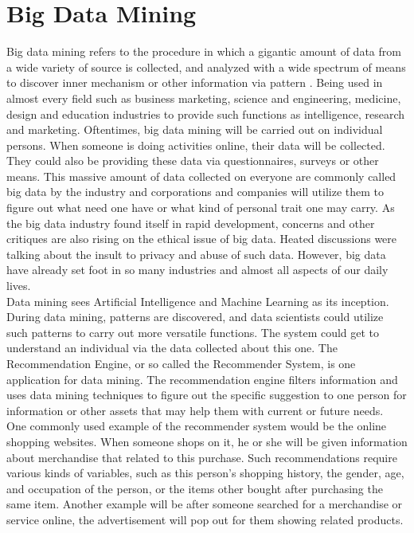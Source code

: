 \documentclass[sigconf]{acmart}
\begin{document}
\section{Big Data Mining}
Big data mining refers to the procedure in which a gigantic amount of data from a wide variety of source is collected, and analyzed with a wide spectrum of means to discover inner mechanism or other information via pattern \cite{Winoto2012}. Being used in almost every field such as business marketing, science and engineering, medicine, design and education industries to provide such functions as intelligence, research and marketing. Oftentimes, big data mining will be carried out on individual persons. When someone is doing activities online, their data will be collected. They could also be providing these data via questionnaires, surveys or other means. This massive amount of data collected on everyone are commonly called big data by the industry and corporations and companies will utilize them to figure out what need one have or what kind of personal trait one may carry.
As the big data industry found itself in rapid development, concerns and other critiques are also rising on the ethical issue of big data. Heated discussions were talking about the insult to privacy and abuse of such data. However, big data have already set foot in so many industries and almost all aspects of our daily lives\cite{Siemens2013}.\\
Data mining sees Artificial Intelligence and Machine Learning as its inception. During data mining, patterns are discovered, and data scientists could utilize such patterns to carry out more versatile functions. The system could get to understand an individual via the data collected about this one. The Recommendation Engine, or so called the Recommender System, is one application for data mining. The recommendation engine filters information and uses data mining techniques to figure out the specific suggestion to one person for information or other assets that may help them with current or future needs.\\
One commonly used example of the recommender system would be the online shopping websites. When someone shops on it, he or she will be given information about merchandise that related to this purchase. Such recommendations require various kinds of variables, such as this person's shopping history, the gender, age, and occupation of the person, or the items other bought after purchasing the same item. Another example will be after someone searched for a merchandise or service online, the advertisement will pop out for them showing related products.\\
\end{document}
